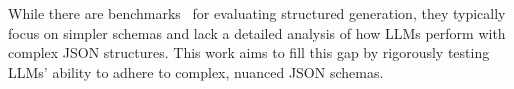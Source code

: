 While there are benchmarks~\citep{zhou2023instruction, chen2024benchmarking, xia2024fofobenchmarkevaluatellms, wang2025verifiableformatcontrollarge,geng2025jsonschemabenchrigorousbenchmarkstructured} for evaluating structured generation, they typically focus on simpler schemas and lack a detailed analysis of how LLMs perform with complex JSON structures. This work aims to fill this gap by rigorously testing LLMs’ ability to adhere to complex, nuanced JSON schemas.